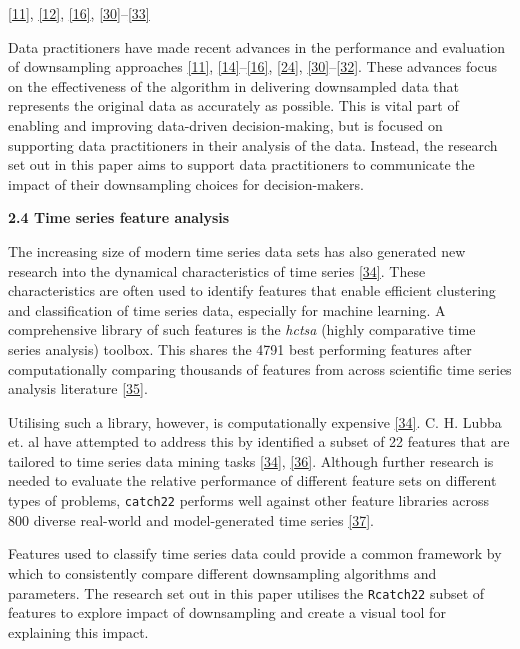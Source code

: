\documentclass{article}
\begin{document}
\protect\hyperlink{ref-datapoint}{{[}11{]}},
\protect\hyperlink{ref-Sveinn}{{[}12{]}},
\protect\hyperlink{ref-MinMaxLTTB}{{[}16{]}},
\protect\hyperlink{ref-dashql}{{[}30{]}}--\protect\hyperlink{ref-M4}{{[}33{]}}

Data practitioners have made recent advances in the performance and
evaluation of downsampling approaches
\protect\hyperlink{ref-datapoint}{{[}11{]}},
\protect\hyperlink{ref-downsampling}{{[}14{]}}--\protect\hyperlink{ref-MinMaxLTTB}{{[}16{]}},
\protect\hyperlink{ref-plotly}{{[}24{]}},
\protect\hyperlink{ref-dashql}{{[}30{]}}--\protect\hyperlink{ref-MinMaxOrdered}{{[}32{]}}.
These advances focus on the effectiveness of the algorithm in delivering
downsampled data that represents the original data as accurately as
possible. This is vital part of enabling and improving data-driven
decision-making, but is focused on supporting data practitioners in
their analysis of the data. Instead, the research set out in this paper
aims to support data practitioners to communicate the impact of their
downsampling choices for decision-makers.

\textbf{2.4 Time series feature analysis}

The increasing size of modern time series data sets has also generated
new research into the dynamical characteristics of time series
\protect\hyperlink{ref-catch22}{{[}34{]}}. These characteristics are
often used to identify features that enable efficient clustering and
classification of time series data, especially for machine learning. A
comprehensive library of such features is the \emph{hctsa} (highly
comparative time series analysis) toolbox. This shares the 4791 best
performing features after computationally comparing thousands of
features from across scientific time series analysis literature
\protect\hyperlink{ref-fulcher2017}{{[}35{]}}.

Utilising such a library, however, is computationally expensive
\protect\hyperlink{ref-catch22}{{[}34{]}}. C. H. Lubba et. al have
attempted to address this by identified a subset of 22 features that are
tailored to time series data mining tasks
\protect\hyperlink{ref-catch22}{{[}34{]}},
\protect\hyperlink{ref-bagnall}{{[}36{]}}. Although further research is
needed to evaluate the relative performance of different feature sets on
different types of problems, \texttt{catch22} performs well against
other feature libraries across 800 diverse real-world and
model-generated time series \protect\hyperlink{ref-henderson}{{[}37{]}}.

Features used to classify time series data could provide a common
framework by which to consistently compare different downsampling
algorithms and parameters. The research set out in this paper utilises
the \texttt{Rcatch22} subset of features to explore impact of
downsampling and create a visual tool for explaining this impact.
\end{document}
